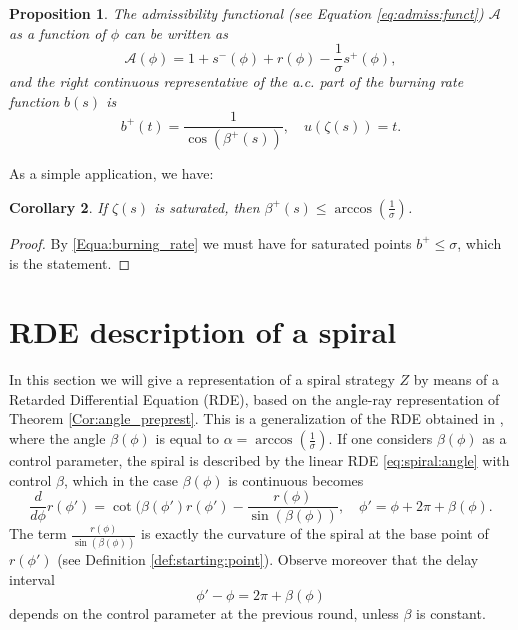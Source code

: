 \documentclass[reqno]{amsart}
\theoremstyle{definition} \newtheorem{definition}{Definition}[section]
\theoremstyle{definition} \newtheorem{remark}[definition]{Remark}
\theoremstyle{plain} \newtheorem{lemma}[definition]{Lemma}
\theoremstyle{plain} \newtheorem{proposition}[definition]{Proposition}
\theoremstyle{plain} \newtheorem{theorem}[definition]{Theorem}
\theoremstyle{plain} \newtheorem{corollary}[definition]{Corollary}
\theoremstyle{definition} \newtheorem{example}[definition]{Example}
\theoremstyle{plain} \newtheorem{claim}[clai]{Claim}
\theoremstyle{definition} \newtheorem{assumption}[definition]{Assumption}
\theoremstyle{definition} \newtheorem{observation}[definition]{Observation}
\newcommand{\1}{\mathbbm 1}
\numberwithin{equation}{section} %
\theoremstyle{plain} \newtheorem*{theorem*}{Theorem}
\theoremstyle{plain} \newtheorem{mthm}[maintheorem]{Main Theorem}
\theoremstyle{plain} \newtheorem*{mthm*}{Main Theorem}
\theoremstyle{plain} \newtheorem*{conjecture*}{Conjecture}
\theoremstyle{plain} \newtheorem{conjecture}[definition]{Conjecture}
\theoremstyle{plain} \newtheorem*{problem*}{Problem}
\begin{document}
\begin{proposition}
\label{Lem:burnign_rate}
The admissibility functional (see Equation \eqref{eq:admiss:funct}) $\mathcal A$ as a function of $\phi$ can be written as
\begin{equation*}%
\mathcal A(\phi) = 1 + s^-(\phi) + r(\phi) - \frac{1}{\sigma} s^+(\phi),
\end{equation*}
and the right continuous representative of the a.c. part of the burning rate function $b(s)$ is
\begin{equation}
\label{Equa:burning_rate}
b^+(t) = \frac{1}{\cos(\beta^+(s))}, \quad u(\zeta(s)) = t.
\end{equation}
\end{proposition}

As a simple application, we have:

\begin{corollary}
\label{Cor:sat_burning}
If $\zeta(s)$ is saturated, then $\beta^+(s) \leq \arccos(\frac{1}{\sigma})$.
\end{corollary}

\begin{proof}
By \eqref{Equa:burning_rate} we must have for saturated points $b^+ \leq \sigma$, which is the statement.
\end{proof}


\section{RDE description of a spiral}
\label{S:ODE}


In this section we will give a representation of a spiral strategy $Z$ by means of a Retarded Differential Equation (RDE), based on the angle-ray representation of Theorem \ref{Cor:angle_preprest}. This is a generalization of the RDE obtained in \cite{firefighter}, where the angle $\beta(\phi)$ is equal to $\alpha = \arccos(\frac{1}{\sigma})$. If one considers $\beta(\phi)$ as a control parameter, the spiral is described by the linear RDE \eqref{eq:spiral:angle} with control $\beta$, which in the case $\beta(\phi)$ is continuous becomes %
\begin{equation*}
\frac{d}{d\phi} r(\phi') = \cot(\beta(\phi') r(\phi') - \frac{r(\phi)}{\sin(\beta(\phi))}, \quad \phi' = \phi + 2\pi + \beta(\phi).
\end{equation*}
The term $\frac{r(\phi)}{\sin(\beta(\phi))}$ is exactly the curvature of the spiral at the base point of $r(\phi')$ (see Definition \ref{def:starting:point}). Observe moreover that the delay interval
\begin{equation*}
\phi' - \phi = 2\pi + \beta(\phi)
\end{equation*}
depends on the control parameter at the previous round, unless $\beta$ is constant.
\end{document}
